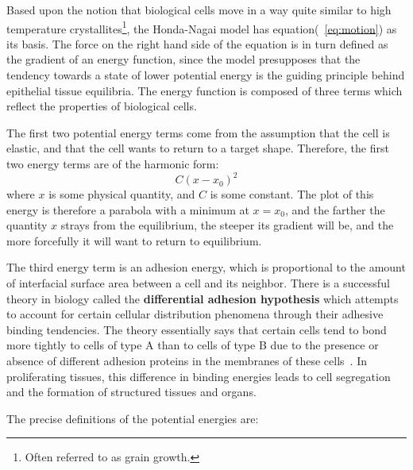 Based upon the notion that biological cells move in a way quite similar to high temperature crystallites\footnote{Often referred to as grain growth.}, the Honda-Nagai model has equation(~\ref{eq:motion}) as its basis. The force on the right hand side of the equation is in turn defined as the gradient of an energy function, since the model presupposes that the tendency towards a state of lower potential energy is the guiding principle behind epithelial tissue equilibria. The energy function is composed of three terms which reflect the properties of biological cells.

The first two potential energy terms come from the assumption that the cell is elastic, and that the cell wants to return to a target shape. Therefore, the first two energy terms are of the harmonic form: 
\begin{equation}
C(x-x_0)^2
\end{equation}
where $x$ is some physical quantity, and $C$ is some constant. The plot of this energy is therefore a parabola with a minimum at $x =  x_0$, and the farther the quantity $x$ strays from the equilibrium, the steeper its gradient will be, and the more forcefully it will want to return to equilibrium.

The third energy term is an adhesion energy, which is proportional to the amount of interfacial surface area between a cell and its neighbor. There is a successful theory in biology called the \textbf{differential adhesion hypothesis} which attempts to account for certain cellular distribution phenomena through their adhesive binding tendencies. The theory essentially says that certain cells tend to bond more tightly to cells of type A than to cells of type B due to the presence or absence of different adhesion proteins in the membranes of these cells~\cite{DA}. In proliferating tissues, this difference in binding energies leads to cell segregation and the formation of structured tissues and organs. 

The precise definitions of the potential energies are:

